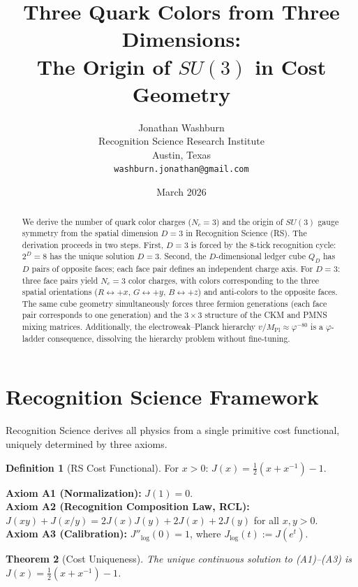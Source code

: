 \documentclass[12pt,a4paper]{article}
\title{Three Quark Colors from Three Dimensions:\\
The Origin of $SU(3)$ in Cost Geometry}
\author{Jonathan Washburn\\
Recognition Science Research Institute\\
Austin, Texas\\
\texttt{washburn.jonathan@gmail.com}}
\date{March 2026}
\newtheorem{theorem}{Theorem}[section]
\theoremstyle{definition}
\newtheorem{definition}[theorem]{Definition}
\theoremstyle{remark}
\begin{document}
\maketitle

\begin{abstract}
We derive the number of quark color charges ($N_c = 3$) and the
origin of $SU(3)$ gauge symmetry from the spatial dimension $D = 3$
in Recognition Science (RS).  The derivation proceeds in two steps.
First, $D = 3$ is forced by the 8-tick recognition cycle:
$2^D = 8$ has the unique solution $D = 3$.  Second, the
$D$-dimensional ledger cube $Q_D$ has $D$ pairs of opposite faces;
each face pair defines an independent charge axis.  For $D = 3$:
three face pairs yield $N_c = 3$ color charges, with colors
corresponding to the three spatial orientations ($R \leftrightarrow +x$,
$G \leftrightarrow +y$, $B \leftrightarrow +z$) and anti-colors to the
opposite faces.  The same cube geometry simultaneously forces three
fermion generations (each face pair corresponds to one generation) and
the $3 \times 3$ structure of the CKM and PMNS mixing matrices.
Additionally, the electroweak--Planck hierarchy
$v/M_{\mathrm{Pl}} \approx \varphi^{-80}$ is a $\varphi$-ladder
consequence, dissolving the hierarchy problem without fine-tuning.
\end{abstract}

\section{Recognition Science Framework}
\label{sec:framework}

Recognition Science derives all physics from a single primitive cost functional,
uniquely determined by three axioms.

\begin{definition}[RS Cost Functional]
For $x > 0$: $J(x) = \tfrac{1}{2}(x + x^{-1}) - 1$.
\end{definition}

\noindent\textbf{Axiom A1 (Normalization):} $J(1) = 0$.\\
\textbf{Axiom A2 (Recognition Composition Law, RCL):}
$J(xy) + J(x/y) = 2J(x)J(y) + 2J(x) + 2J(y)$ for all $x, y > 0$.\\
\textbf{Axiom A3 (Calibration):} $J''_{\log}(0) = 1$, where
$J_{\log}(t) := J(e^t)$.

\begin{theorem}[Cost Uniqueness]
\label{thm:unique}
The unique continuous solution to \textup{(A1)--(A3)} is
$J(x) = \tfrac{1}{2}(x + x^{-1}) - 1$.
\end{theorem}
\end{document}

